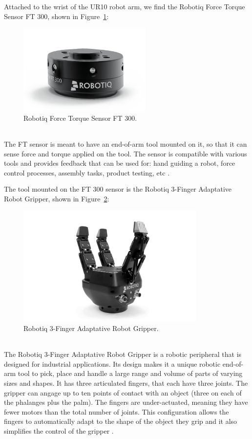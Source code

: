 Attached to the wrist of the UR10 robot arm, we find the Robotiq Force Torque Sensor FT 300, shown in Figure~\ref{fig:ft300}:\\
\begin{figure}[h!]
	\centering
	\includegraphics[height=45mm]{chapters/figures/intro/ft300.jpg}
	\caption{Robotiq Force Torque Sensor FT 300.}
	\label{fig:ft300}
\end{figure}\\
The FT sensor is meant to have an end-of-arm tool mounted on it, so that it can sense force and torque applied on the tool. The sensor is compatible with various tools and provides feedback that can be used for: hand guiding a robot, force control processes, assembly tasks, product testing, etc \cite{robotiq2016ftsensor}.

The tool mounted on the FT 300 sensor is the Robotiq 3-Finger Adaptative Robot Gripper, shown in Figure~\ref{fig:gripper}:
\begin{figure}[htbp]
	\centering
	\includegraphics[height=60mm]{chapters/figures/intro/gripper.jpg}
	\caption{Robotiq 3-Finger Adaptative Robot Gripper.}
	\label{fig:gripper}
\end{figure}\\
The Robotiq 3-Finger Adaptative Robot Gripper is a robotic peripheral that is designed for industrial applications. Its design makes it a unique robotic end-of-arm tool to pick, place and handle a large range and volume of parts of varying sizes and shapes. It has three articulated fingers, that each have three joints. The gripper can angage up to ten points of contact with an object (three on each of the phalanges plus the palm). The fingers are under-actuated, meaning they have fewer motors than the total number of joints. This configuration allows the fingers to automatically adapt to the shape of the object they grip and it also simplifies the control of the gripper \cite{robotiq2014gripper}.

